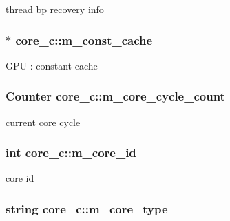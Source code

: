 \label{classcore__c_a6f33ae7ae833c7c78596c4461cd39684}
thread bp recovery info \hypertarget{classcore__c_a261f82109e1752f5b793be98049f1c33}{
\subsubsection[{m\_\-const\_\-cache}]{$\ast$ {\bf core\_\-c::m\_\-const\_\-cache}}}
\label{classcore__c_a261f82109e1752f5b793be98049f1c33}
GPU : constant cache \hypertarget{classcore__c_af0b6b28e16f1e720accf21f3f4e6b345}{
\subsubsection[{m\_\-core\_\-cycle\_\-count}]{\setlength{\rightskip}{0pt plus 5cm}Counter {\bf core\_\-c::m\_\-core\_\-cycle\_\-count}}}
\label{classcore__c_af0b6b28e16f1e720accf21f3f4e6b345}
current core cycle \hypertarget{classcore__c_a4754ed1da4f42b4fb0d3141f2a415da2}{
\subsubsection[{m\_\-core\_\-id}]{\setlength{\rightskip}{0pt plus 5cm}int {\bf core\_\-c::m\_\-core\_\-id}}}
\label{classcore__c_a4754ed1da4f42b4fb0d3141f2a415da2}
core id \hypertarget{classcore__c_adf344458048cd602bb5ed05704db3891}{
\subsubsection[{m\_\-core\_\-type}]{\setlength{\rightskip}{0pt plus 5cm}string {\bf core\_\-c::m\_\-core\_\-type}}}
